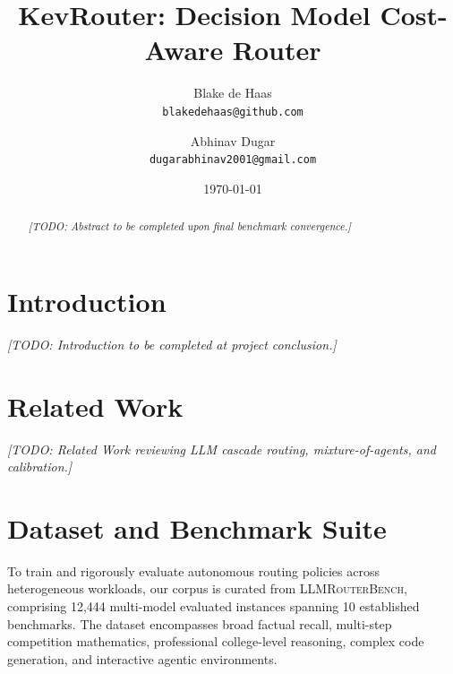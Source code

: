 \documentclass[11pt,a4paper]{article}
\title{\textbf{KevRouter: Decision Model Cost-Aware Router}}
\author{Blake de Haas \\
\texttt{blakedehaas@github.com}
\and Abhinav Dugar \\
\texttt{dugarabhinav2001@gmail.com}
}
\date{\today}
\begin{document}
\maketitle

\begin{abstract}
\noindent\textit{[TODO: Abstract to be completed upon final benchmark convergence.]}
\end{abstract}

\section{Introduction}
\label{sec:introduction}
\noindent\textit{[TODO: Introduction to be completed at project conclusion.]}

\section{Related Work}
\label{sec:related_work}
\noindent\textit{[TODO: Related Work reviewing LLM cascade routing, mixture-of-agents, and calibration.]}

\section{Dataset and Benchmark Suite}
\label{sec:dataset}

To train and rigorously evaluate autonomous routing policies across heterogeneous workloads, our corpus is curated from \textsc{LLMRouterBench}, comprising 12,444 multi-model evaluated instances spanning 10 established benchmarks. The dataset encompasses broad factual recall, multi-step competition mathematics, professional college-level reasoning, complex code generation, and interactive agentic environments.
\end{document}
